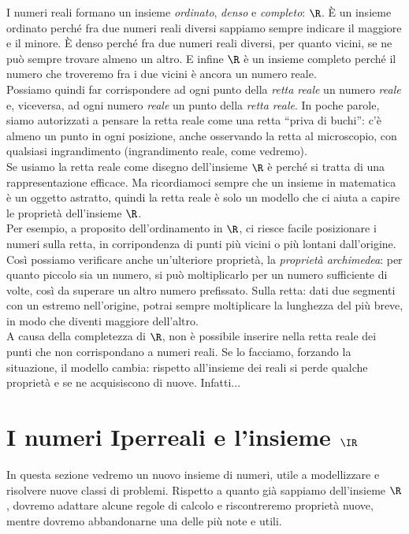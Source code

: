 I numeri reali formano un insieme \emph{ordinato}, \emph{denso} e 
\emph{completo}: $\R$. È un insieme ordinato perché fra due numeri reali
diversi sappiamo sempre indicare il maggiore e il minore. È denso
perché fra due numeri reali diversi, per quanto vicini, se ne può 
sempre trovare almeno un altro. E infine \(\R\) è un insieme completo 
perché il numero che troveremo fra i due vicini è ancora un numero reale.\\
Possiamo quindi far corrispondere ad ogni punto della \emph{retta reale} un 
numero \emph{reale} e, viceversa, ad ogni numero \emph{reale} un punto 
della \emph{retta reale}. In poche parole, siamo
autorizzati a pensare la retta reale come una retta ``priva di buchi'':
c'è almeno un punto
in ogni posizione, anche osservando la retta al microscopio, 
con qualsiasi ingrandimento (ingrandimento reale, come vedremo).\\
Se usiamo la retta reale come disegno dell'insieme \(\R\) è perché
si tratta di una rappresentazione efficace. Ma ricordiamoci sempre che un insieme 
in matematica è un oggetto astratto, quindi la retta reale è solo
un modello che ci aiuta a capire le proprietà dell'insieme \(\R\).\\
Per esempio, a proposito dell'ordinamento in \(\R\), ci riesce facile
posizionare i numeri sulla retta, in corripondenza di punti più vicini o più lontani 
dall'origine. Così possiamo verificare anche un'ulteriore proprietà, la 
\emph{proprietà archimedea}: per quanto piccolo sia un numero, si può moltiplicarlo 
per un numero sufficiente di volte, così da superare un altro numero prefissato.
Sulla retta: dati due segmenti con un estremo nell'origine, potrai sempre moltiplicare
la lunghezza del più breve, in modo che diventi maggiore dell'altro.\\
A causa della completezza di \(\R\), non è possibile inserire
nella retta reale dei punti che non corrispondano a numeri reali. Se lo facciamo, 
forzando la situazione, il modello cambia: 
rispetto all'insieme dei reali si perde qualche proprietà e se ne acquisiscono di nuove.
Infatti...


\section{I numeri Iperreali e l'insieme $\IR$}
\label{sec:insnum_iperreali}

In questa sezione vedremo un nuovo insieme di numeri, utile a modellizzare e 
risolvere nuove classi di problemi. Rispetto a quanto già sappiamo dell'insieme 
\(\R\), dovremo adattare alcune regole di calcolo e riscontreremo proprietà nuove, mentre 
dovremo abbandonarne una delle più note e utili. 

